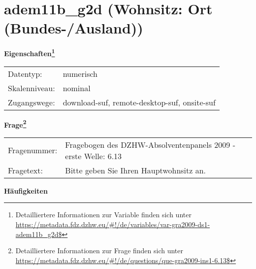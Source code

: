 
    \setcounter{footnote}{0}

    \vspace*{-1.8cm}
	\section{adem11b\_g2d (Wohnsitz: Ort (Bundes-/Ausland))}
	\label{section:adem11b_g2d}



    \vspace*{0.5cm}
    \noindent\textbf{Eigenschaften\footnote{Detailliertere Informationen zur Variable finden sich unter
		\url{https://metadata.fdz.dzhw.eu/\#!/de/variables/var-gra2009-ds1-adem11b_g2d$}}}\\
	\begin{tabularx}{\hsize}{@{}lX}
	Datentyp: & numerisch \\
	Skalenniveau: & nominal \\
	Zugangswege: &
	  download-suf, 
	  remote-desktop-suf, 
	  onsite-suf
 \\
    \end{tabularx}



				\vspace*{0.5cm}
                \noindent\textbf{Frage\footnote{Detailliertere Informationen zur Frage finden sich unter
		              \url{https://metadata.fdz.dzhw.eu/\#!/de/questions/que-gra2009-ins1-6.13$}}}\\
				\begin{tabularx}{\hsize}{@{}lX}
					Fragenummer: &
					  Fragebogen des DZHW-Absolventenpanels 2009 - erste Welle:
					  6.13
 \\
					Fragetext: & Bitte geben Sie Ihren Hauptwohnsitz an. \\
				\end{tabularx}





        		\vspace*{0.5cm}
                \noindent\textbf{Häufigkeiten}

